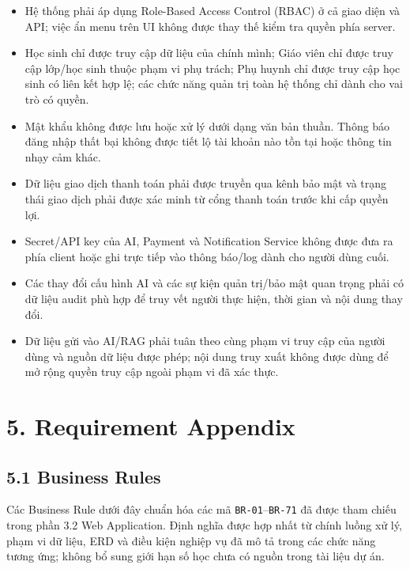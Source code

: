 \documentclass[12pt,a4paper,oneside]{report}
\begin{document}
\begin{itemize}
    \item Hệ thống phải áp dụng Role-Based Access Control (RBAC) ở cả giao diện và API; việc ẩn menu trên UI không được thay thế kiểm tra quyền phía server.
    \item Học sinh chỉ được truy cập dữ liệu của chính mình; Giáo viên chỉ được truy cập lớp/học sinh thuộc phạm vi phụ trách; Phụ huynh chỉ được truy cập học sinh có liên kết hợp lệ; các chức năng quản trị toàn hệ thống chỉ dành cho vai trò có quyền.
    \item Mật khẩu không được lưu hoặc xử lý dưới dạng văn bản thuần. Thông báo đăng nhập thất bại không được tiết lộ tài khoản nào tồn tại hoặc thông tin nhạy cảm khác.
    \item Dữ liệu giao dịch thanh toán phải được truyền qua kênh bảo mật và trạng thái giao dịch phải được xác minh từ cổng thanh toán trước khi cấp quyền lợi.
    \item Secret/API key của AI, Payment và Notification Service không được đưa ra phía client hoặc ghi trực tiếp vào thông báo/log dành cho người dùng cuối.
    \item Các thay đổi cấu hình AI và các sự kiện quản trị/bảo mật quan trọng phải có dữ liệu audit phù hợp để truy vết người thực hiện, thời gian và nội dung thay đổi.
    \item Dữ liệu gửi vào AI/RAG phải tuân theo cùng phạm vi truy cập của người dùng và nguồn dữ liệu được phép; nội dung truy xuất không được dùng để mở rộng quyền truy cập ngoài phạm vi đã xác thực.
\end{itemize}

\clearpage
\section*{5. Requirement Appendix}

\subsection*{5.1 Business Rules}

Các Business Rule dưới đây chuẩn hóa các mã \texttt{BR-01}--\texttt{BR-71} đã được tham chiếu trong phần 3.2 Web Application. Định nghĩa được hợp nhất từ chính luồng xử lý, phạm vi dữ liệu, ERD và điều kiện nghiệp vụ đã mô tả trong các chức năng tương ứng; không bổ sung giới hạn số học chưa có nguồn trong tài liệu dự án.
\end{document}
